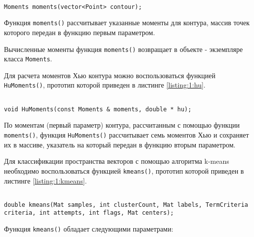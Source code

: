 \begin{lstlisting}

Moments moments(vector<Point> contour);

\end{lstlisting}
\mylistingend

Функция \verb|moments()| рассчитывает указанные моменты для контура, массив точек которого передан в функцию первым параметром.

Вычисленные моменты функция \verb|moments()| возвращает в объекте - экземпляре класса \verb|Moments|.

Для расчета моментов Хью контура можно воспользоваться функцией \verb|HuMoments()|, прототип которой приведен в листинге \ref{listing:1:hu}.

\begin{lstlisting}

void HuMoments(const Moments & moments, double * hu);

\end{lstlisting}
\mylistingend

По моментам (первый параметр) контура, рассчитанным с помощью функции \verb|moments()|, функция \verb|HuMoments()| рассчитывает семь моментов Хью и сохраняет их в массиве, указатель на который передан в функцию вторым параметром.


Для классификации пространства векторов с помощью алгоритма k-means необходимо воспользоваться функцией \verb|kmeans()|, прототип которой приведен в листинге \ref{listing:1:kmeans}.

\begin{lstlisting}

double kmeans(Mat samples, int clusterCount, Mat labels, TermCriteria criteria, int attempts, int flags, Mat centers);

\end{lstlisting}
\mylistingend

Функция \verb|kmeans()| обладает следующими параметрами:

